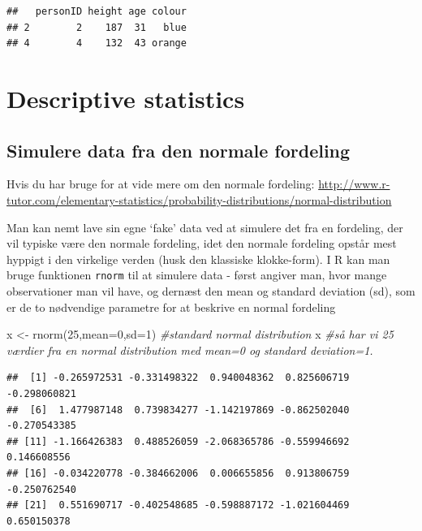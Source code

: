 \documentclass[
]{book}
\newenvironment{Shaded}{\begin{snugshade}}{\end{snugshade}}
\newcommand{\AttributeTok}[1]{\textcolor[rgb]{0.77,0.63,0.00}{#1}}
\newcommand{\CommentTok}[1]{\textcolor[rgb]{0.56,0.35,0.01}{\textit{#1}}}
\newcommand{\DecValTok}[1]{\textcolor[rgb]{0.00,0.00,0.81}{#1}}
\newcommand{\FunctionTok}[1]{\textcolor[rgb]{0.00,0.00,0.00}{#1}}
\newcommand{\NormalTok}[1]{#1}
\newcommand{\OtherTok}[1]{\textcolor[rgb]{0.56,0.35,0.01}{#1}}
\begin{document}
\begin{verbatim}
##   personID height age colour
## 2        2    187  31   blue
## 4        4    132  43 orange
\end{verbatim}

\hypertarget{descriptive-statistics}{%
\section{Descriptive statistics}\label{descriptive-statistics}}

\hypertarget{simulere-data-fra-den-normale-fordeling}{%
\subsection{Simulere data fra den normale fordeling}\label{simulere-data-fra-den-normale-fordeling}}

Hvis du har bruge for at vide mere om den normale fordeling: \url{http://www.r-tutor.com/elementary-statistics/probability-distributions/normal-distribution}

Man kan nemt lave sin egne `fake' data ved at simulere det fra en fordeling, der vil typiske være den normale fordeling, idet den normale fordeling opstår mest hyppigt i den virkelige verden (husk den klassiske klokke-form). I R kan man bruge funktionen \texttt{rnorm} til at simulere data - først angiver man, hvor mange observationer man vil have, og dernæst den mean og standard deviation (sd), som er de to nødvendige parametre for at beskrive en normal fordeling

\begin{Shaded}
\begin{Highlighting}[]
\NormalTok{x }\OtherTok{\textless{}{-}} \FunctionTok{rnorm}\NormalTok{(}\DecValTok{25}\NormalTok{,}\AttributeTok{mean=}\DecValTok{0}\NormalTok{,}\AttributeTok{sd=}\DecValTok{1}\NormalTok{) }\CommentTok{\#standard normal distribution}
\NormalTok{x }\CommentTok{\#så har vi 25 værdier fra en normal distribution med mean=0 og standard deviation=1.}
\end{Highlighting}
\end{Shaded}

\begin{verbatim}
##  [1] -0.265972531 -0.331498322  0.940048362  0.825606719 -0.298060821
##  [6]  1.477987148  0.739834277 -1.142197869 -0.862502040 -0.270543385
## [11] -1.166426383  0.488526059 -2.068365786 -0.559946692  0.146608556
## [16] -0.034220778 -0.384662006  0.006655856  0.913806759 -0.250762540
## [21]  0.551690717 -0.402548685 -0.598887172 -1.021604469  0.650150378
\end{verbatim}
\end{document}
